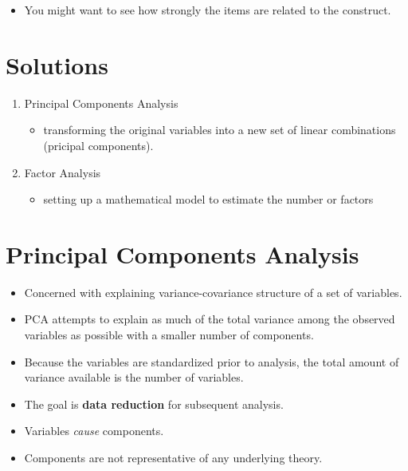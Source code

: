 \documentclass[
]{book}
\providecommand{\tightlist}{%
  \setlength{\itemsep}{0pt}\setlength{\parskip}{0pt}}
\begin{document}
\begin{itemize}
\tightlist
\item
  You might want to see how strongly the items are related to the construct.
\end{itemize}

\hypertarget{solutions}{%
\section{Solutions}\label{solutions}}

\begin{enumerate}
\def\labelenumi{\arabic{enumi}.}
\item
  Principal Components Analysis

  \begin{itemize}
  \tightlist
  \item
    transforming the original variables into a new set of linear combinations (pricipal components).
  \end{itemize}
\item
  Factor Analysis

  \begin{itemize}
  \tightlist
  \item
    setting up a mathematical model to estimate the number or factors
  \end{itemize}
\end{enumerate}

\hypertarget{principal-components-analysis}{%
\section{Principal Components Analysis}\label{principal-components-analysis}}

\begin{itemize}
\tightlist
\item
  Concerned with explaining variance-covariance structure of a set of variables.
\item
  PCA attempts to explain as much of the total variance among the observed variables as possible with a smaller number of components.
\item
  Because the variables are standardized prior to analysis, the total amount of variance available is the number of variables.
\item
  The goal is \textbf{data reduction} for subsequent analysis.
\item
  Variables \emph{cause} components.
\item
  Components are not representative of any underlying theory.
\end{itemize}
\end{document}
